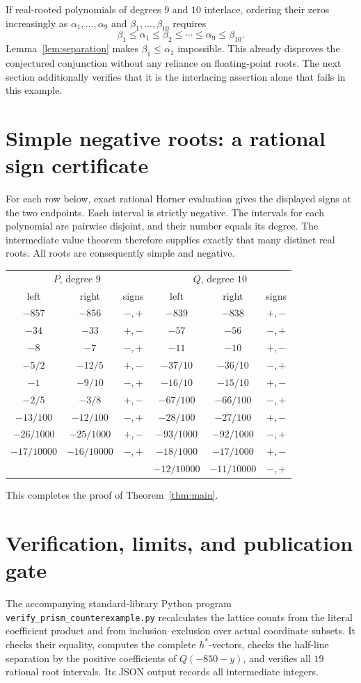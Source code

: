 \documentclass[11pt]{article}
\begin{document}
If real-rooted polynomials of degrees $9$ and $10$ interlace, ordering their zeros increasingly as $\alpha_1,\ldots,\alpha_9$ and $\beta_1,\ldots,\beta_{10}$ requires
\[
\beta_1\le\alpha_1\le\beta_2\le\cdots\le\alpha_9\le\beta_{10}.
\]
Lemma~\ref{lem:separation} makes $\beta_1\le\alpha_1$ impossible. This already disproves the conjectured conjunction without any reliance on floating-point roots. The next section additionally verifies that it is the interlacing assertion alone that fails in this example.

\section{Simple negative roots: a rational sign certificate}
For each row below, exact rational Horner evaluation gives the displayed signs at the two endpoints. Each interval is strictly negative. The intervals for each polynomial are pairwise disjoint, and their number equals its degree. The intermediate value theorem therefore supplies exactly that many distinct real roots. All roots are consequently simple and negative.

\begin{center}
\begin{tabular}{c c c|c c c}
\toprule
\multicolumn{3}{c|}{$P$, degree $9$}&\multicolumn{3}{c}{$Q$, degree $10$}\\
left&right&signs&left&right&signs\\
\midrule
$-857$&$-856$&$-,+$&$-839$&$-838$&$+,-$\\
$-34$&$-33$&$+,-$&$-57$&$-56$&$-,+$\\
$-8$&$-7$&$-,+$&$-11$&$-10$&$+,-$\\
$-5/2$&$-12/5$&$+,-$&$-37/10$&$-36/10$&$-,+$\\
$-1$&$-9/10$&$-,+$&$-16/10$&$-15/10$&$+,-$\\
$-2/5$&$-3/8$&$+,-$&$-67/100$&$-66/100$&$-,+$\\
$-13/100$&$-12/100$&$-,+$&$-28/100$&$-27/100$&$+,-$\\
$-26/1000$&$-25/1000$&$+,-$&$-93/1000$&$-92/1000$&$-,+$\\
$-17/10000$&$-16/10000$&$-,+$&$-18/1000$&$-17/1000$&$+,-$\\
&&&$-12/10000$&$-11/10000$&$-,+$\\
\bottomrule
\end{tabular}
\end{center}
This completes the proof of Theorem~\ref{thm:main}.

\section{Verification, limits, and publication gate}
The accompanying standard-library Python program \texttt{verify\_prism\_counterexample.py} recalculates the lattice counts from the literal coefficient product and from inclusion--exclusion over actual coordinate subsets. It checks their equality, computes the complete $h^*$-vectors, checks the half-line separation by the positive coefficients of $Q(-850-y)$, and verifies all $19$ rational root intervals. Its JSON output records all intermediate integers.
\end{document}
